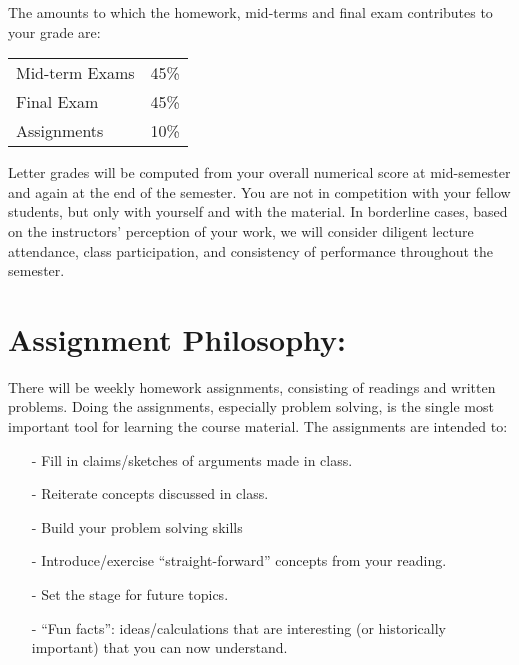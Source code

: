 \documentclass[margin,line]{res}
\begin{document}
\begin{resume}
The amounts to which the homework, mid-terms and final exam contributes to your grade are:
\begin{center}
\begin{tabular}{lc}
Mid-term Exams & 45\%\\
Final Exam     & 45\%\\
Assignments    & 10\%\\
\end{tabular}
\end{center}

Letter grades will be computed from your overall numerical score at mid-semester and again at the end of the semester.
You are not in competition with your fellow students, but only with yourself and with the material.
In borderline cases, based on the instructors' perception of your work, we will consider diligent lecture attendance, class participation, and consistency of performance throughout the semester.



\section{Assignment Philosophy:}

There will be weekly homework assignments, consisting of readings and written problems.
Doing the assignments, especially problem solving, is the single most important tool for learning the course material.
The assignments are intended to:\\

\begin{itemize}
\item[-] Fill in claims/sketches of arguments made in class.
\item[-] Reiterate concepts discussed in class.
\item[-] Build your problem solving skills
\item[-] Introduce/exercise ``straight-forward'' concepts from your reading. 
\item[-] Set the stage for future topics.
\item[-] ``Fun facts'': ideas/calculations that are interesting (or historically important) that you can now understand.
\end{itemize}




\end{resume}
\end{document}
